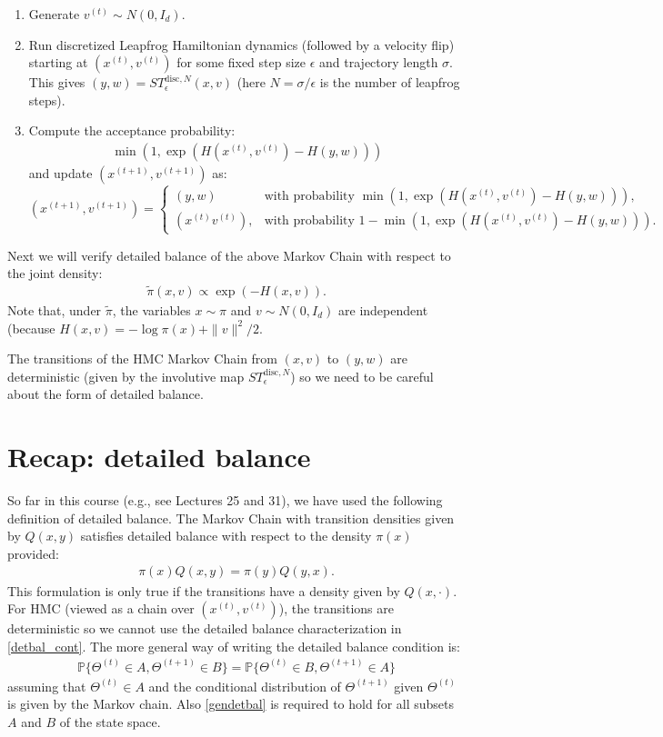\documentclass{scrartcl}
\renewcommand{\P}{{\mathbb P}}
\begin{document}
\begin{enumerate}
\item Generate $v^{(t)} \sim N(0, I_d)$.
\item Run discretized Leapfrog Hamiltonian dynamics (followed  by a
  velocity flip) starting at
  $(x^{(t)}, v^{(t)})$ for some fixed step size $\epsilon$ and
  trajectory length $\sigma$. This gives $(y, w) =
  S T_{\epsilon}^{\text{disc}, N}(x, v)$ (here $N = \sigma/\epsilon$ is
  the number of leapfrog steps).
\item Compute the acceptance probability: 
  \begin{align*}
    \min \left(1, \exp(H(x^{(t)}, v^{(t)}) - H(y, w)) \right)
  \end{align*}
  and update $(x^{(t+1)}, v^{(t+1)})$ as:
  \[
(x^{(t+1)}, v^{(t+1)}) =
\begin{cases}
(y, w) & \text{with probability }     \min \left(1, \exp(H(x^{(t)},
     v^{(t)}) - H(y, w)) \right), \\[1em] 
(x^{(t)} v^{(t)}), & \text{with probability } 1 - \min \left(1, \exp(H(x^{(t)},
     v^{(t)}) - H(y, w)) \right). 
\end{cases}
\] 
\end{enumerate}
Next we will verify detailed balance of the above Markov Chain with
respect to the joint density:
\begin{align*}
  \tilde{\pi}(x, v) \propto \exp \left(-H(x, v) \right).  
\end{align*}
Note that, under $\tilde{\pi}$, the variables $x \sim \pi$ and $v \sim
N(0, I_d)$ are independent (because $H(x, v) = -\log \pi(x) +
\|v\|^2/2$.

The transitions of the HMC Markov Chain from $(x, v)$ to $(y, w)$ are
deterministic (given by the involutive map $S
T_{\epsilon}^{\text{disc}, N}$) so we need to be careful about the
form of detailed balance.

\section{Recap: detailed balance}
So far in this course (e.g., see Lectures 25 and 31), we have used the
following definition of detailed balance. The Markov Chain with
transition densities given by $Q(x, y)$ satisfies detailed balance
with respect to the density $\pi(x)$ provided:
\begin{align}\label{detbal_cont}
  \pi(x) Q(x, y) = \pi(y) Q(y, x). 
\end{align}
This formulation is only true if the transitions have a density given
by $Q(x, \cdot)$. For HMC (viewed as a chain over $(x^{(t)},
v^{(t)})$), the transitions are deterministic so we cannot use the
detailed balance characterization in \eqref{detbal_cont}. The more
general way of writing the detailed balance condition is:
\begin{align}\label{gendetbal}
  \P\{\Theta^{(t)} \in A, \Theta^{(t+1)} \in B\} =   \P\{\Theta^{(t)}
  \in B, \Theta^{(t+1)} \in A\}
\end{align}
assuming that $\Theta^{(t)} \in A$ and the conditional distribution of
$\Theta^{(t+1)}$ given $\Theta^{(t)}$ is given by the Markov
chain. Also \eqref{gendetbal} is required to hold for all subsets $A$
and $B$ of the state space.
\end{document}
